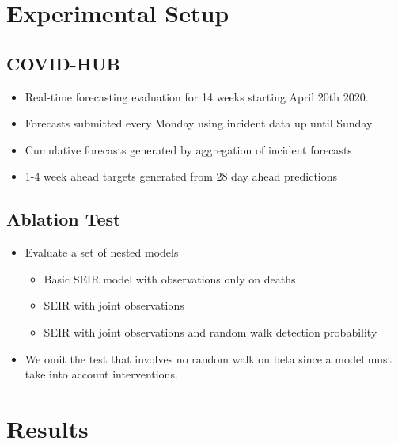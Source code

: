 \documentclass[11pt]{amsart}
\begin{document}
   
   
 \section{Experimental Setup}
 
 
 \subsection{COVID-HUB}
 \begin{itemize}
 \item Real-time forecasting evaluation for 14 weeks starting April 20th 2020. 
 \item Forecasts submitted every Monday using incident data up until Sunday
 \item Cumulative forecasts generated by aggregation of incident forecasts
 \item 1-4 week ahead targets generated from 28 day ahead predictions 
 \end{itemize}
 
 \subsection{Ablation Test}
 \begin{itemize}
 \item Evaluate a set of nested models
 \begin{itemize}
 \item Basic SEIR model with observations only on deaths
 \item SEIR with joint observations
 \item SEIR with joint observations and random walk detection probability
 \end{itemize}
 \item We omit the test that involves no random walk on beta since a model must take into account interventions.

 
 \end{itemize}


\section{Results}
\end{document}
